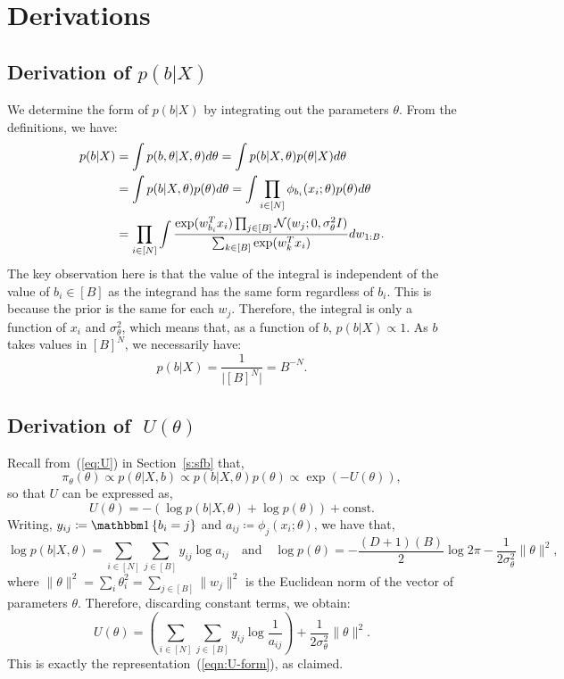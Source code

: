 \section{Derivations}

\subsection{Derivation of {\boldmath $p(b|X)$}}
\label{appdx:b|x}

We determine the form of $p(b| X)$ by integrating
out the parameters $\theta$. From the definitions, we have:
%
\begin{align*}
	p(b | X) &= \int p(b , \theta| X, \theta) d\theta = \int p(b | X, \theta) p(\theta | X) d\theta \\
	&=\int p(b | X, \theta) p(\theta) d\theta = \int \prod_{i \in [N] } \phi_{b_i}(x_i; \theta) p(\theta) d\theta \\
	&= \prod_{i \in [N]} \int \frac{\exp(w_{b_i}^T x_i) \prod_{j \in [B]} \mathcal{N}(w_j; 0, \sigma_\theta^2 I)}{\sum_{k \in [B]} \exp(w_{k}^T x_i)} dw_{1:B}.
\end{align*}
%
The key observation here is that 
the value of the integral is independent
of the value of $b_i \in [B]$ as
the integrand has the same form regardless of $b_i$. This is
because the prior is the same for each $w_j$. 
Therefore, the integral is only a function of $x_i$ and $\sigma_\theta^2$,
which means that, as a function of $b$, $p(b|X)\propto 1$. As
$b$ takes values in $[B]^N$, we necessarily have:
%
\begin{equation}
	p(b | X) = \frac{1}{\big|[B]^N\big|}=B^{-N}.
\end{equation}

\subsection{Derivation of {\boldmath $\;U(\theta)$}}
\label{appdx:form-U}

Recall from~(\ref{eq:U}) in Section~\ref{s:sfb} that,
$$	\pi_\theta(\theta) \propto p(\theta | X, b) \propto p(b | X, \theta) p(\theta) \propto  \exp \left( - U(\theta) \right),
$$ 
so that $U$ can be expressed as,
$$
U(\theta) 
= - \left( \log p(b | X, \theta) + \log p(\theta) \right) + \textrm{const}.
$$
Writing,
$y_{ij} \coloneqq \one \left\{ b_i = j \right\}$ and 
$a_{ij} \coloneqq \phi_j(x_i; \theta)$, we have that,
%
\begin{equation}
	\log p(b | X, \theta) = \sum_{i \in [N]} \sum_{j \in [B]} y_{ij} \log a_{ij}  \quad \textrm{and} \quad
	\log p(\theta) = -\frac{(D+1)(B)}{2} \log 2\pi - \frac{1}{2 \sigma_\theta^2} 
	\|\theta \|^2,
	\label{eqn:U-constituent-terms}
\end{equation}
%
where
$\|\theta\|^2 = \sum_{i} \theta_{i}^2 = \sum_{j \in [B]} \|w_j\|^2$ 
is the Euclidean norm of the vector of parameters $\theta$.
Therefore, discarding constant terms, we 
obtain:
%
\begin{equation}
	U(\theta) = \left( \sum_{i \in [N]} \sum_{j \in [B]} y_{ij} \log \frac{1}{a_{ij}} \right)
	+ \frac{1}{2\sigma_\theta^2} \|\theta\|^2.
\end{equation}
%
This is exactly the representation~(\ref{eqn:U-form}), as claimed.

